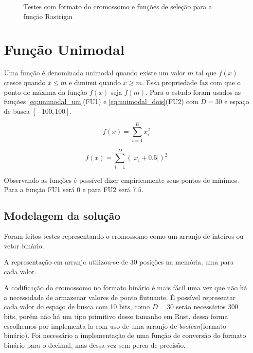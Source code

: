 \documentclass[conference]{IEEEtran}
\begin{document}
\begin{figure}[!t]
\centering
{}
\hfil
{}
\hfil
{} 
\caption{Testes com formato do cromossomo e funções de seleção para a função Rastrigin}
\label{dados_rastrigin}
\end{figure}

\section{Função Unimodal}

Uma função é denominada unimodal quando existe um valor $m$ tal que $f(x)$ cresce quando $x \leq m  $ e diminui quando $x \geq m$. Essa propriedade faz com que o ponto de máxima da função $f(x)$ seja $f(m)$. Para o estudo foram usados as funções \ref{eq:unimodal_um}(FU1) e \ref{eq:unimodal_dois}(FU2) com $D=30$ e espaço de busca $[-100, 100]$. 

\begin{equation}\label{eq:unimodal_um}
f(x) = \sum_{i=1}^D x_{i}^2
\end{equation}

\begin{equation}\label{eq:unimodal_dois}
f(x) = \sum_{i=1}^D \left(|x_{i} + 0.5|\right)^2
\end{equation}

Observando as funções é possível dizer empiricamente seus pontos de mínimos. Para a função FU1 será $0$ e para FU2 será $7.5$.

\subsection{Modelagem da solução}

Foram feitos testes representando o cromossomo como um arranjo de inteiros ou vetor binário. 

A representação em arranjo utilizou-se de $30$ posições na memória, uma para cada valor.

A codificação do cromossomo no formato binário é mais fácil uma vez que não há a necessidade de armazenar valores de ponto flutuante. É possível representar cada valor do espaço de busca com 10 bits, como $D = 30$ serão necessários $300$ bits, porém não há um tipo primitivo desse tamanho em Rust, dessa forma escolhemos por implementa-la com uso de uma arranjo de \textit{boolean}(formato binário). Foi necessário a implementação de uma função de conversão do formato binário para o decimal, mas dessa vez sem perca de precisão.
\end{document}
